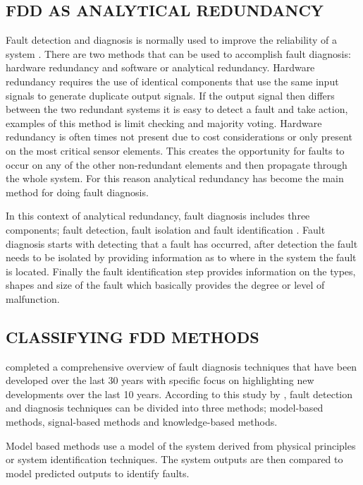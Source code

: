 \subsection{FDD AS ANALYTICAL REDUNDANCY}

Fault detection and diagnosis is normally used to improve the reliability of a system \cite{gao2015survey}. There are two methods that can be used to accomplish fault diagnosis:  hardware redundancy and software or analytical redundancy. Hardware redundancy requires the use of identical components that use the same input signals to generate duplicate output signals. If the output signal then differs between the two redundant systems it is easy to detect a fault and take action, examples of this method is limit checking and majority voting. Hardware redundancy is often times not present due to cost considerations or only present on the most critical sensor elements. This creates the opportunity for faults to occur on any of the other non-redundant elements and then propagate through the whole system. For this reason analytical redundancy has become the main method for doing fault diagnosis.\par

In this context of analytical redundancy, fault diagnosis includes three components; fault detection, fault isolation and fault identification \cite{gao2015survey}. Fault diagnosis starts with detecting that a fault has occurred, after detection the fault needs to be isolated by providing information as to where in the system the fault is located. Finally the fault identification step provides information on the types, shapes and size of the fault which basically provides the degree or level of malfunction.\par

\subsection{CLASSIFYING FDD METHODS}

\cite{gao2015survey} completed a comprehensive overview of fault diagnosis techniques that have been developed over the last 30 years with specific focus on highlighting new developments over the last 10 years. According to this study by \cite{gao2015survey}, fault detection and diagnosis techniques can be divided into three methods; model-based methods, signal-based methods and knowledge-based methods.\par

Model based methods use a model of the system derived from physical principles or system identification techniques. The system outputs are then compared to model predicted outputs to identify faults.\par


